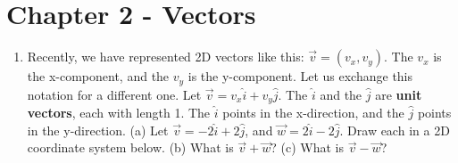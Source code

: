 \documentclass{article}
\begin{document}
\vspace{5cm}

\section{Chapter 2 - Vectors}

\begin{enumerate}
\item Recently, we have represented 2D vectors like this: $\vec{v} = (v_x,v_y)$.  The $v_x$ is the x-component, and the $v_y$ is the y-component.  Let us exchange this notation for a different one.  Let $\vec{v} = v_x \hat{i} + v_y \hat{j}$.  The $\hat{i}$ and the $\hat{j}$ are \textbf{unit vectors}, each with length 1.  The $\hat{i}$ points in the x-direction, and the $\hat{j}$ points in the y-direction. (a) Let $\vec{v} = -2\hat{i} + 2\hat{j}$, and $\vec{w} = 2\hat{i} - 2\hat{j}$.  Draw each in a 2D coordinate system below. (b) What is $\vec{v} + \vec{w}$?  (c) What is $\vec{v} - \vec{w}$? \\ \vspace{3cm}

\end{enumerate}
\end{document}

